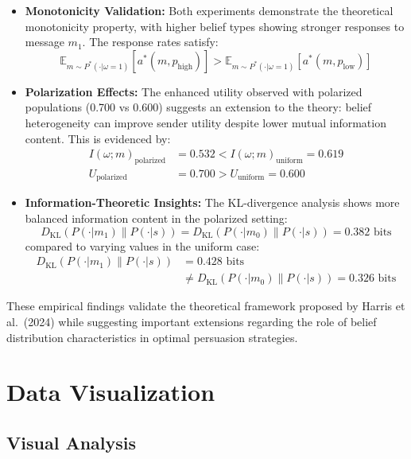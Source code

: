 \documentclass[12pt]{article}
\theoremstyle{plain}
\theoremstyle{definition}
\theoremstyle{remark}
\begin{document}
\begin{itemize}
    \item \textbf{Monotonicity Validation:} Both experiments demonstrate the theoretical monotonicity property, with higher belief types showing stronger responses to message $m_1$. The response rates satisfy:
    \[\mathbb{E}_{m\sim P^*(\cdot|\omega=1)} [a^*(m,p_{\text{high}})] > \mathbb{E}_{m\sim P^*(\cdot|\omega=1)} [a^*(m,p_{\text{low}})]\]

    \item \textbf{Polarization Effects:} The enhanced utility observed with polarized populations (0.700 vs 0.600) suggests an extension to the theory: belief heterogeneity can improve sender utility despite lower mutual information content. This is evidenced by:
    \begin{align*}
        I(\omega;m)_{\text{polarized}} &= 0.532 < I(\omega;m)_{\text{uniform}} = 0.619 \\
        U_{\text{polarized}} &= 0.700 > U_{\text{uniform}} = 0.600
    \end{align*}

    \item \textbf{Information-Theoretic Insights:} The KL-divergence analysis shows more balanced information content in the polarized setting:
    \[D_{\text{KL}}(P(\cdot|m_1)\|P(\cdot|s)) = D_{\text{KL}}(P(\cdot|m_0)\|P(\cdot|s)) = 0.382 \text{ bits}\]
    compared to varying values in the uniform case:
    \begin{align*}
        D_{\text{KL}}(P(\cdot|m_1)\|P(\cdot|s)) &= 0.428 \text{ bits} \\
        &\neq D_{\text{KL}}(P(\cdot|m_0)\|P(\cdot|s)) = 0.326 \text{ bits}
    \end{align*}
\end{itemize}

These empirical findings validate the theoretical framework proposed by Harris et al.\ (2024) while suggesting important extensions regarding the role of belief distribution characteristics in optimal persuasion strategies.

\pagebreak
\section{Data Visualization}

\subsection{Visual Analysis}
\end{document}

